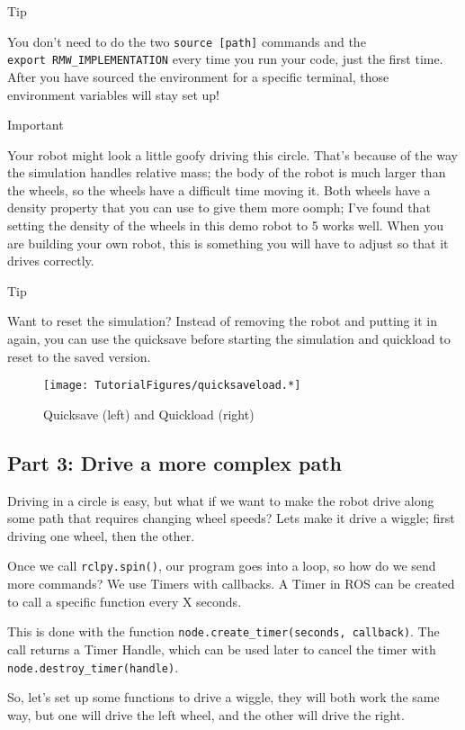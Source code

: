 Tip

You don't need to do the two \texttt{source\ {[}path{]}} commands and
the \texttt{export\ RMW\_IMPLEMENTATION} every time you run your code,
just the first time. After you have sourced the environment for a
specific terminal, those environment variables will stay set up!

Important

Your robot might look a little goofy driving this circle. That's because
of the way the simulation handles relative mass; the body of the robot
is much larger than the wheels, so the wheels have a difficult time
moving it. Both wheels have a {density} property that you can use to
give them more oomph; I've found that setting the density of the wheels
in this demo robot to 5 works well. When you are building your own
robot, this is something you will have to adjust so that it drives
correctly.

Tip

Want to reset the simulation? Instead of removing the robot and putting
it in again, you can use the quicksave before starting the simulation
and quickload to reset to the saved version.

\begin{figure}
\centering
\texttt{[image: TutorialFigures/quicksaveload.*]}
\caption{Quicksave (left) and Quickload (right)}
\end{figure}

\hypertarget{part-3-drive-a-more-complex-path}{%
\subsection{Part 3: Drive a more complex
path}\label{part-3-drive-a-more-complex-path}}

Driving in a circle is easy, but what if we want to make the robot drive
along some path that requires changing wheel speeds? Lets make it drive
a wiggle; first driving one wheel, then the other.

Once we call \texttt{rclpy.spin()}, our program goes into a loop, so how
do we send more commands? We use Timers with callbacks. A Timer in ROS
can be created to call a specific function every X seconds.

This is done with the function
\texttt{node.create\_timer(seconds,\ callback)}. The call returns a
Timer Handle, which can be used later to cancel the timer with
\texttt{node.destroy\_timer(handle)}.

So, let's set up some functions to drive a wiggle, they will both work
the same way, but one will drive the left wheel, and the other will
drive the right.

